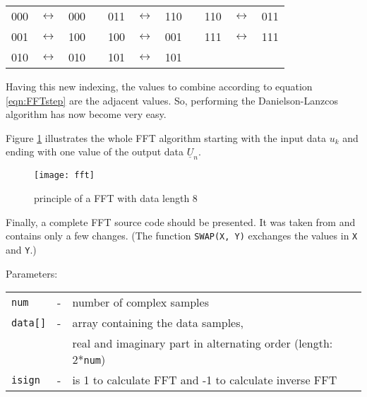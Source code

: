\addvspace{12pt}

\begin{tabular}{ccccccccccc}
000 & $\leftrightarrow$ & 000  & \qquad\qquad &  011 & $\leftrightarrow$ & 110  & \qquad\qquad &  110 & $\leftrightarrow$ & 011 \\
001 & $\leftrightarrow$ & 100  & \qquad\qquad &  100 & $\leftrightarrow$ & 001  & \qquad\qquad &  111 & $\leftrightarrow$ & 111 \\
010 & $\leftrightarrow$ & 010  & \qquad\qquad &  101 & $\leftrightarrow$ & 101 \\
\end{tabular}

\addvspace{12pt}

Having this new indexing, the values to combine according to
equation \ref{eqn:FFTstep} are the adjacent values. So, performing
the Danielson-Lanzcos algorithm has now become very easy.

\addvspace{12pt}

Figure \ref{fig:fft} illustrates the whole FFT algorithm starting with the
input data $u_k$ and ending with one value of the output data
$\underline{U}_n$.

\begin{figure}[htb]
\begin{center}
\texttt{[image: fft]}
\end{center}
\caption{principle of a FFT with data length 8}
\label{fig:fft}
\end{figure}
\FloatBarrier

Finally, a complete FFT source code should be presented. It was taken
from \cite{Press} and contains only a
few changes. (The function \texttt{SWAP(X, Y)} exchanges the values in
\texttt{X} and \texttt{Y}.)

\addvspace{12pt}

Parameters:\\
\begin{tabular}{lcl}
\texttt{num}    & - & number of complex samples\\
\texttt{data[]} & - & array containing the data samples,\\
                &   & real and imaginary part in alternating order (length: 2*\texttt{num})\\
\texttt{isign}  & - & is 1 to calculate FFT and -1 to calculate inverse FFT
\end{tabular}

\addvspace{12pt}

